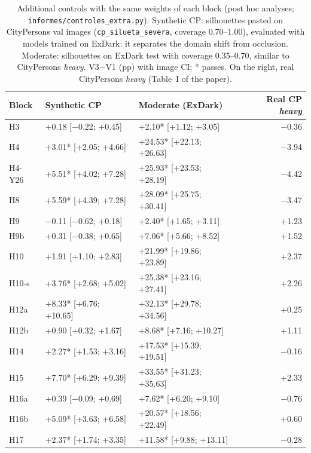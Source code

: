 \begin{table}[H]\centering\scriptsize
\caption{Additional controls with the same weights of each block (post hoc analyses; \texttt{informes/controles\_extra.py}). Synthetic CP: silhouettes pasted on CityPersons val images (\texttt{cp\_silueta\_severa}, coverage 0.70--1.00), evaluated with models trained on ExDark: it separates the domain shift from occlusion. Moderate: silhouettes on ExDark test with coverage 0.35--0.70, similar to CityPersons \emph{heavy}. V3$-$V1 (pp) with image CI; * passes. On the right, real CityPersons \emph{heavy} (Table~I of the paper).}\label{tab:s-controles-extra}
\begin{tabular}{@{}l ll r@{}}\toprule
Block & Synthetic CP & Moderate (ExDark) & Real CP \emph{heavy} \\
\midrule
H3 & +0.18 [$-$0.22; +0.45] & +2.10* [+1.12; +3.05] & $-$0.36 \\
H4 & +3.01* [+2.05; +4.66] & +24.53* [+22.13; +26.63] & $-$3.94 \\
H4-Y26 & +5.51* [+4.02; +7.28] & +25.93* [+23.53; +28.19] & $-$4.42 \\
H8 & +5.59* [+4.39; +7.28] & +28.09* [+25.75; +30.41] & $-$3.47 \\
H9 & $-$0.11 [$-$0.62; +0.18] & +2.40* [+1.65; +3.11] & +1.23 \\
H9b & +0.31 [$-$0.38; +0.65] & +7.06* [+5.66; +8.52] & +1.52 \\
H10 & +1.91 [+1.10; +2.83] & +21.99* [+19.86; +23.89] & +2.37 \\
H10-s & +3.76* [+2.68; +5.02] & +25.38* [+23.16; +27.41] & +2.26 \\
H12a & +8.33* [+6.76; +10.65] & +32.13* [+29.78; +34.56] & +0.25 \\
H12b & +0.90 [+0.32; +1.67] & +8.68* [+7.16; +10.27] & +1.11 \\
H14 & +2.27* [+1.53; +3.16] & +17.53* [+15.39; +19.51] & $-$0.16 \\
H15 & +7.70* [+6.29; +9.39] & +33.55* [+31.23; +35.63] & +2.33 \\
H16a & +0.39 [$-$0.09; +0.69] & +7.62* [+6.20; +9.10] & $-$0.76 \\
H16b & +5.09* [+3.63; +6.58] & +20.57* [+18.56; +22.49] & +0.60 \\
H17 & +2.37* [+1.74; +3.35] & +11.58* [+9.88; +13.11] & $-$0.28 \\
\bottomrule\end{tabular}\end{table}
